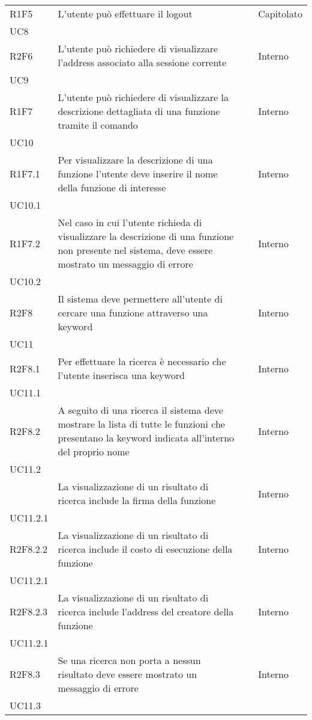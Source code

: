 \begin{longtable}{ 
		>{\centering}p{} 
		>{}p{} 
		>{\centering}p{}
		>{\centering}p{} }
	R1F5 & L'utente può effettuare il logout 										& \ob & Capitolato \\ UC8 \tabularnewline 
	
	R2F6 & L'utente può richiedere di visualizzare l'address 
			associato alla sessione corrente 										& \de & Interno \\ UC9 \tabularnewline
	
	R1F7 & L'utente può richiedere di visualizzare la descrizione dettagliata di una funzione
		tramite il comando \info{}													& \ob & Interno \\ UC10 \tabularnewline
	R1F7.1 & Per visualizzare la descrizione di una funzione l'utente deve inserire 
		il nome della funzione di interesse											& \ob & Interno \\ UC10.1 \tabularnewline
	R1F7.2 & Nel caso in cui l'utente richieda di visualizzare la descrizione di una 
		funzione non presente nel sistema, deve essere mostrato un messaggio di
		errore															 			& \ob & Interno \\ UC10.2 \tabularnewline
	
	R2F8 & Il sistema deve permettere all'utente di cercare una funzione 
		attraverso una keyword 														& \de & Interno \\ UC11 \tabularnewline
	R2F8.1 & Per effettuare la ricerca è necessario che l'utente inserisca 
		una keyword 																& \de & Interno \\ UC11.1 \tabularnewline
	R2F8.2 & A seguito di una ricerca il sistema deve mostrare la lista di
	 tutte le funzioni che presentano la keyword indicata 
	 all'interno del proprio nome													& \de & Interno \\ UC11.2 \tabularnewline
	  & La visualizzazione di un risultato di ricerca include
		 la firma della funzione													& \de & Interno \\ UC11.2.1 \tabularnewline
  	R2F8.2.2 & La visualizzazione di un risultato di ricerca include
		  il costo di esecuzione della funzione										& \de & Interno \\ UC11.2.1 \tabularnewline
  	R2F8.2.3 & La visualizzazione di un risultato di ricerca include
		  l'address del creatore della funzione										& \de & Interno \\ UC11.2.1 \tabularnewline
	R2F8.3 & Se una ricerca non porta a nessun risultato deve essere mostrato un 
		messaggio di errore 														& \de & Interno \\ UC11.3 	\tabularnewline	
	

\end{longtable}
